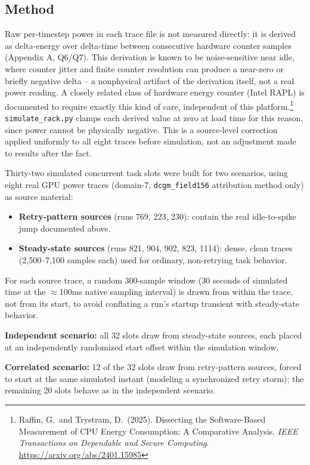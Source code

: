 \documentclass[10pt]{article}
\begin{document}
\subsection{Method}

Raw per-timestep power in each trace file is not measured directly: it is
derived as delta-energy over delta-time between consecutive hardware
counter samples (Appendix A, Q6/Q7). This derivation is known to be
noise-sensitive near idle, where counter jitter and finite counter
resolution can produce a near-zero or briefly negative delta -- a
nonphysical artifact of the derivation itself, not a real power reading.
A closely related class of hardware energy counter (Intel RAPL) is
documented to require exactly this kind of care, independent of this
platform.\footnote{Raffin, G.\ and Trystram, D.\ (2025). Dissecting the
Software-Based Measurement of CPU Energy Consumption: A Comparative
Analysis. \emph{IEEE Transactions on Dependable and Secure Computing}.
\url{https://arxiv.org/abs/2401.15985}}
\texttt{simulate\_rack.py} clamps each derived value at zero at load time
for this reason, since power cannot be physically negative. This is a
source-level correction applied uniformly to all eight traces before
simulation, not an adjustment made to results after the fact.

Thirty-two simulated concurrent task slots were built for two scenarios,
using eight real GPU power traces (domain-7, \texttt{dcgm\_field156}
attribution method only) as source material:

\begin{itemize}
\item \textbf{Retry-pattern sources} (runs 769, 223, 230): contain the real
  idle-to-spike jump documented above.
\item \textbf{Steady-state sources} (runs 821, 904, 902, 823, 1114): dense,
  clean traces (2{,}500--7{,}100 samples each) used for ordinary,
  non-retrying task behavior.
\end{itemize}

For each source trace, a random 300-sample window (30 seconds of simulated
time at the $\approx$100ms native sampling interval) is drawn from within
the trace, not from its start, to avoid conflating a run's startup transient
with steady-state behavior.

\textbf{Independent scenario:} all 32 slots draw from steady-state sources,
each placed at an independently randomized start offset within the
simulation window.

\textbf{Correlated scenario:} 12 of the 32 slots draw from retry-pattern
sources, forced to start at the same simulated instant (modeling a
synchronized retry storm); the remaining 20 slots behave as in the
independent scenario.
\end{document}
